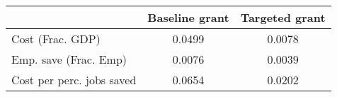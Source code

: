  \begin{tabular}{lcc} \hline \hline 
  & Baseline grant & Targeted grant  \\ 
 \hline 
 Cost (Frac. GDP) &   0.0499 &   0.0078  \\ 
 Emp. save (Frac. Emp) &   0.0076 &   0.0039  \\ 
 Cost per perc. jobs saved &   0.0654 &   0.0202  \\ 
\hline \hline 
 \end{tabular} 
